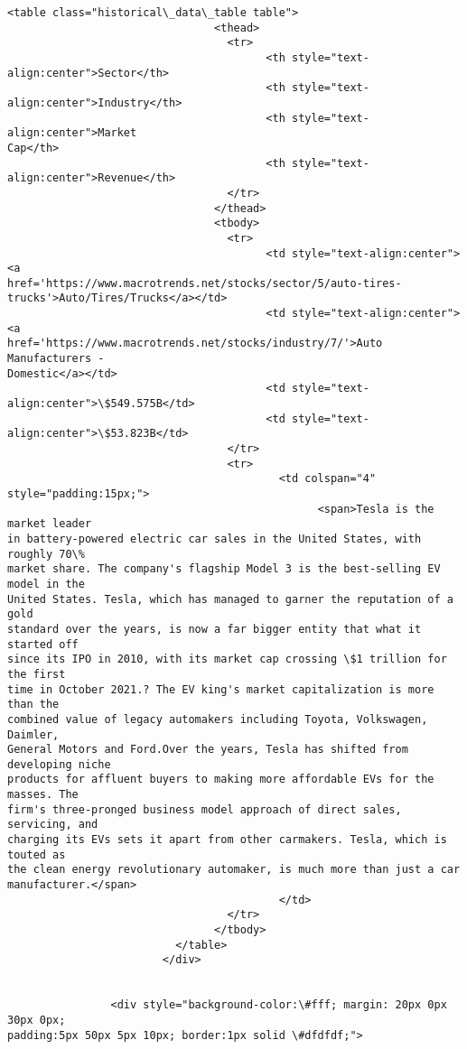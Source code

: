\documentclass[11pt]{article}
\begin{document}
\begin{Verbatim}[commandchars=\\\{\}]
                          <table class="historical\_data\_table table">
                                <thead>
                                  <tr>
                                        <th style="text-
align:center">Sector</th>
                                        <th style="text-
align:center">Industry</th>
                                        <th style="text-align:center">Market
Cap</th>
                                        <th style="text-
align:center">Revenue</th>
                                  </tr>
                                </thead>
                                <tbody>
                                  <tr>
                                        <td style="text-align:center"><a
href='https://www.macrotrends.net/stocks/sector/5/auto-tires-
trucks'>Auto/Tires/Trucks</a></td>
                                        <td style="text-align:center"><a
href='https://www.macrotrends.net/stocks/industry/7/'>Auto Manufacturers -
Domestic</a></td>
                                        <td style="text-
align:center">\$549.575B</td>
                                        <td style="text-
align:center">\$53.823B</td>
                                  </tr>
                                  <tr>
                                          <td colspan="4" style="padding:15px;">
                                                <span>Tesla is the market leader
in battery-powered electric car sales in the United States, with roughly 70\%
market share. The company's flagship Model 3 is the best-selling EV model in the
United States. Tesla, which has managed to garner the reputation of a gold
standard over the years, is now a far bigger entity that what it started off
since its IPO in 2010, with its market cap crossing \$1 trillion for the first
time in October 2021.? The EV king's market capitalization is more than the
combined value of legacy automakers including Toyota, Volkswagen, Daimler,
General Motors and Ford.Over the years, Tesla has shifted from developing niche
products for affluent buyers to making more affordable EVs for the masses. The
firm's three-pronged business model approach of direct sales, servicing, and
charging its EVs sets it apart from other carmakers. Tesla, which is touted as
the clean energy revolutionary automaker, is much more than just a car
manufacturer.</span>
                                          </td>
                                  </tr>
                                </tbody>
                          </table>
                        </div>


                <div style="background-color:\#fff; margin: 20px 0px 30px 0px;
padding:5px 50px 5px 10px; border:1px solid \#dfdfdf;">



\end{Verbatim}
\end{document}
